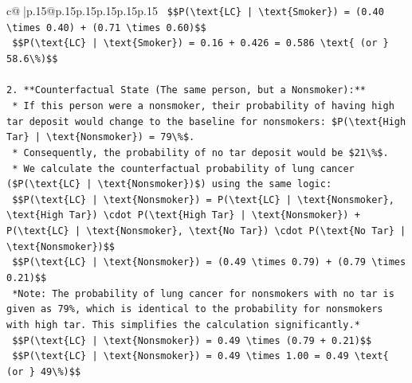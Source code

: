 \documentclass{article}
\begin{document}
{\begin{supertabular}{c@{$\;$}|p{.15\linewidth}@{}p{.15\linewidth}p{.15\linewidth}p{.15\linewidth}p{.15\linewidth}p{.15\linewidth}}
{{{\texttt{        \$\$P(\textbackslash{}text\{LC\} | \textbackslash{}text\{Smoker\}) = (0.40 \textbackslash{}times 0.40) + (0.71 \textbackslash{}times 0.60)\$\$} \\
\texttt{        \$\$P(\textbackslash{}text\{LC\} | \textbackslash{}text\{Smoker\}) = 0.16 + 0.426 = 0.586 \textbackslash{}text\{ (or \} 58.6\textbackslash{}\%)\$\$} \\
\\ 
\texttt{2.  **Counterfactual State (The same person, but a Nonsmoker):**} \\
\texttt{    *   If this person were a nonsmoker, their probability of having high tar deposit would change to the baseline for nonsmokers: \$P(\textbackslash{}text\{High Tar\} | \textbackslash{}text\{Nonsmoker\}) = 79\textbackslash{}\%\$.} \\
\texttt{    *   Consequently, the probability of no tar deposit would be \$21\textbackslash{}\%\$.} \\
\texttt{    *   We calculate the counterfactual probability of lung cancer (\$P(\textbackslash{}text\{LC\} | \textbackslash{}text\{Nonsmoker\})\$) using the same logic:} \\
\texttt{        \$\$P(\textbackslash{}text\{LC\} | \textbackslash{}text\{Nonsmoker\}) = P(\textbackslash{}text\{LC\} | \textbackslash{}text\{Nonsmoker\}, \textbackslash{}text\{High Tar\}) \textbackslash{}cdot P(\textbackslash{}text\{High Tar\} | \textbackslash{}text\{Nonsmoker\}) + P(\textbackslash{}text\{LC\} | \textbackslash{}text\{Nonsmoker\}, \textbackslash{}text\{No Tar\}) \textbackslash{}cdot P(\textbackslash{}text\{No Tar\} | \textbackslash{}text\{Nonsmoker\})\$\$} \\
\texttt{        \$\$P(\textbackslash{}text\{LC\} | \textbackslash{}text\{Nonsmoker\}) = (0.49 \textbackslash{}times 0.79) + (0.79 \textbackslash{}times 0.21)\$\$} \\
\texttt{        *Note: The probability of lung cancer for nonsmokers with no tar is given as 79\%, which is identical to the probability for nonsmokers with high tar. This simplifies the calculation significantly.*} \\
\texttt{        \$\$P(\textbackslash{}text\{LC\} | \textbackslash{}text\{Nonsmoker\}) = 0.49 \textbackslash{}times (0.79 + 0.21)\$\$} \\
\texttt{        \$\$P(\textbackslash{}text\{LC\} | \textbackslash{}text\{Nonsmoker\}) = 0.49 \textbackslash{}times 1.00 = 0.49 \textbackslash{}text\{ (or \} 49\textbackslash{}\%)\$\$} \\
}}}
\end{supertabular}}
\end{document}
